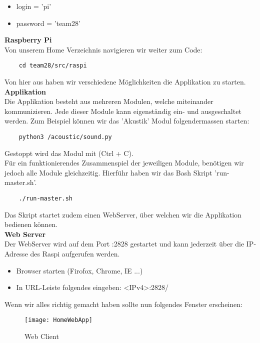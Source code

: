 \documentclass[../../main.tex]{subfiles}
\begin{document}
\begin{itemize}
    \item login = 'pi'
    \item password = 'team28'
\end{itemize}

\textbf{Raspberry Pi}\\
Von unserem Home Verzeichnis navigieren wir weiter zum Code: \\
\begin{lstlisting}
    cd team28/src/raspi
\end{lstlisting}
Von hier aus haben wir verschiedene Möglichkeiten die Applikation zu starten. \\

\textbf{Applikation}\\
Die Applikation besteht aus mehreren Modulen, welche miteinander kommunizieren. Jede dieser Module kann eigenständig ein- und ausgeschaltet werden. Zum Beispiel können wir das 'Akustik' Modul folgendermassen starten: \\
\begin{lstlisting}
    python3 /acoustic/sound.py
\end{lstlisting}
Gestoppt wird das Modul mit (Ctrl + C).\\
Für ein funktionierendes Zusammenspiel der jeweiligen Module, benötigen wir jedoch alle Module gleichzeitig. Hierführ haben wir das Bash Skript 'run-master.sh'. \\
\begin{lstlisting}
    ./run-master.sh
\end{lstlisting}
Das Skript startet zudem einen WebServer, über welchen wir die Applikation bedienen können. \\

\textbf{Web Server}\\
Der WebServer wird auf dem Port :2828 gestartet und kann jederzeit über die IP-Adresse des Raspi aufgerufen werden.
\begin{itemize}
    \item Browser starten (Firofox, Chrome, IE ...)
    \item In URL-Leiste folgendes eingeben: <IPv4>:2828/
\end{itemize}

Wenn wir alles richtig gemacht haben sollte nun folgendes Fenster erscheinen:
\begin{figure}[H] \centering
    \texttt{[image: HomeWebApp]}
    \caption{Web Client}
    \label{fig:Home}
\end{figure}
\end{document}

